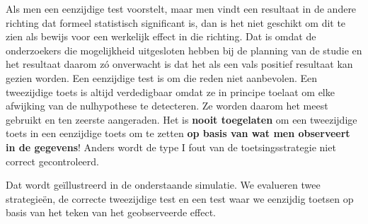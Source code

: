 \documentclass[
  12pt,dutch]{book}
\newenvironment{Shaded}{\begin{snugshade}}{\end{snugshade}}
\newcommand{\AttributeTok}[1]{\textcolor[rgb]{0.13,0.29,0.53}{#1}}
\newcommand{\ControlFlowTok}[1]{\textcolor[rgb]{0.13,0.29,0.53}{\textbf{#1}}}
\newcommand{\DecValTok}[1]{\textcolor[rgb]{0.00,0.00,0.81}{#1}}
\newcommand{\FloatTok}[1]{\textcolor[rgb]{0.00,0.00,0.81}{#1}}
\newcommand{\FunctionTok}[1]{\textcolor[rgb]{0.13,0.29,0.53}{\textbf{#1}}}
\newcommand{\NormalTok}[1]{#1}
\newcommand{\OtherTok}[1]{\textcolor[rgb]{0.56,0.35,0.01}{#1}}
\newcommand{\SpecialCharTok}[1]{\textcolor[rgb]{0.81,0.36,0.00}{\textbf{#1}}}
\newcommand{\StringTok}[1]{\textcolor[rgb]{0.31,0.60,0.02}{#1}}
\theoremstyle{definition}
\theoremstyle{definition}
\theoremstyle{definition}
\theoremstyle{definition}
\theoremstyle{remark}
\begin{document}
Als men een eenzijdige test voorstelt, maar men
vindt een resultaat in de andere richting
dat formeel statistisch significant is, dan is het niet geschikt om dit te
zien als bewijs voor een werkelijk effect in die richting. Dat is omdat de
onderzoekers die mogelijkheid uitgesloten hebben bij de planning van de
studie en het resultaat daarom zó onverwacht is dat het als een vals
positief resultaat kan gezien worden. Een eenzijdige test is om die reden
niet aanbevolen. Een tweezijdige toets is altijd verdedigbaar omdat ze in principe toelaat om elke afwijking van de nulhypothese te detecteren. Ze worden daarom het meest gebruikt en ten zeerste aangeraden.
Het is \textbf{nooit toegelaten} om een tweezijdige toets in een eenzijdige
toets om te zetten \textbf{op basis van wat men observeert in de gegevens}!
Anders wordt de type I fout van de toetsingsstrategie niet correct gecontroleerd.

Dat wordt geïllustreerd in de onderstaande simulatie.
We evalueren twee strategieën, de correcte tweezijdige test en een test waar we eenzijdig toetsen op basis van het teken van het geobserveerde effect.

\begin{Shaded}
\end{Shaded}
\end{document}
